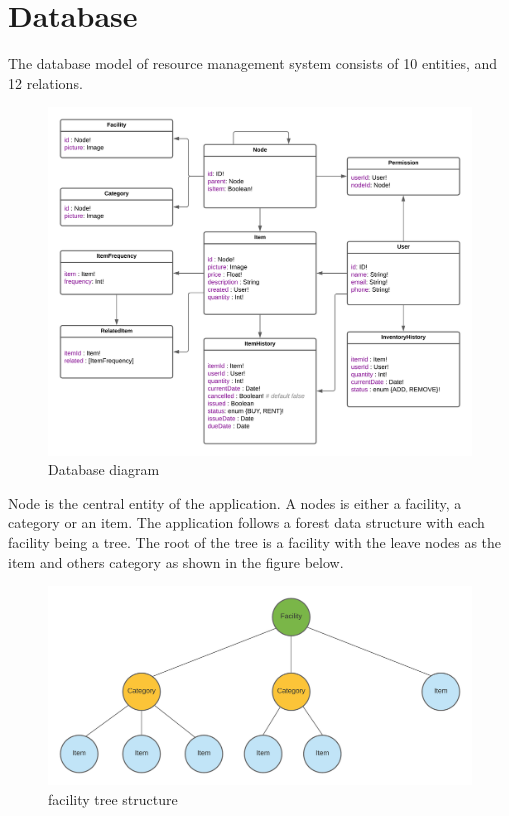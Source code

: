 \chapter{Database}
The database model of resource management system consists of 10 entities, and 12 relations. 
\begin{figure}[H]
    \centering
    \includegraphics[scale=0.12]{images/schema.png}
    \caption{Database diagram}
    \label{fig:schema}
\end{figure}
\clearpage
Node is the central entity of the application. A nodes is either a facility, a category or an item. The application follows a forest data structure with each facility being a tree. The root of the tree is a facility with the leave nodes as the item and others category as shown in the figure below.
\begin{figure}[H]
    \centering
    \includegraphics[scale=0.12]{images/db-overview.png}
    \caption{facility tree structure}
    \label{fig:db-overview}
\end{figure}

